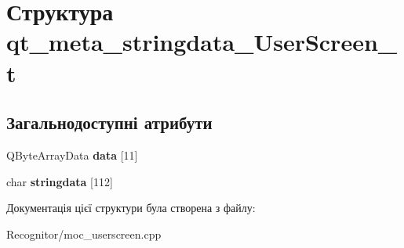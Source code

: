\hypertarget{structqt__meta__stringdata__UserScreen__t}{\section{Структура qt\-\_\-meta\-\_\-stringdata\-\_\-\-User\-Screen\-\_\-t}
\label{structqt__meta__stringdata__UserScreen__t}
}
\subsection*{Загальнодоступні атрибути}
\begin{DoxyCompactItemize}
\item 
\hypertarget{structqt__meta__stringdata__UserScreen__t_acd72156d5b155fea32a0248c1724c4d1}{Q\-Byte\-Array\-Data {\bfseries data} \mbox{[}11\mbox{]}}\label{structqt__meta__stringdata__UserScreen__t_acd72156d5b155fea32a0248c1724c4d1}

\item 
\hypertarget{structqt__meta__stringdata__UserScreen__t_ace3d7ec5b8f13f42a1b256620a22e71f}{char {\bfseries stringdata} \mbox{[}112\mbox{]}}\label{structqt__meta__stringdata__UserScreen__t_ace3d7ec5b8f13f42a1b256620a22e71f}

\end{DoxyCompactItemize}


Документація цієї структури була створена з файлу\-:\begin{DoxyCompactItemize}
\item 
Recognitor/moc\-\_\-userscreen.\-cpp\end{DoxyCompactItemize}

